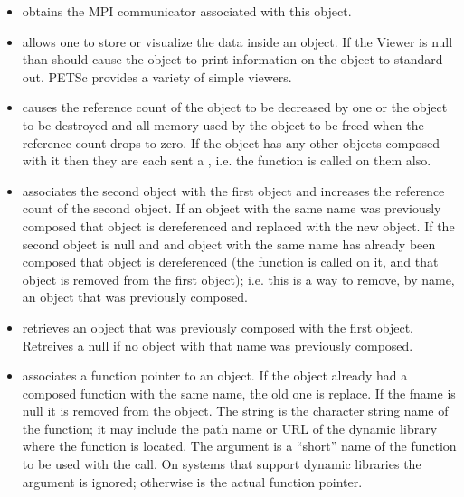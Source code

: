 \documentclass[twoside,12pt]{../sty/report_petsc}
\begin{document}
\begin{itemize}
\item {} obtains the MPI communicator associated
      with this object.

\item {} allows one to store or visualize the data inside
      an object. If the Viewer is null than should cause the object to print
      information on the object to standard out. PETSc provides a variety of simple
      viewers.

\item {} causes the reference count of the object to be decreased
      by one or the object to be destroyed and all memory used by the object to be freed when
      the reference count drops to zero.
      If the object has any other objects composed with it then they are each sent a
      , i.e. the  function is called on them also.

\item {} associates the second object with
      the first object and increases the reference count of the second object. If an
      object with the
      same name was previously composed that object is dereferenced and replaced with
      the new object. If the
      second object is null and and object with the same name has already been
      composed that object is dereferenced (the  function is called on
      it, and that object is removed from the first object); i.e. this is a way to
      remove, by name, an object that was previously composed.

\item {} retrieves an object that was
      previously composed with the first object. Retreives a null if no object with
      that name was previously composed.

\item {} associates a function
      pointer to an object. If the object already had a composed function with the
      same name, the old one is replace. If the fname is null it is removed from
      the object. The string  is the  character string name of the function;
      it may include the path name or URL of the dynamic library where the function is located.
      The argument  is a ``short'' name of the function to be used with the
       call. On systems that support dynamic libraries the 
      argument is ignored; otherwise  is the actual function pointer.


\end{itemize}
\end{document}

